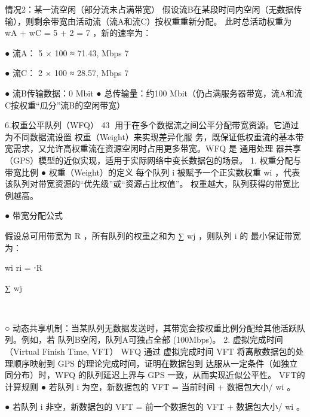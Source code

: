 情况2：某一流空闲（部分流未占满带宽）
假设流B在某段时间内空闲（无数据传输），则剩余带宽由活动流（流A和流C）按权重重新分配。
此时总活动权重为 wA + wC = 5 + 2 = 7 ，新的速率为：    ​   ​




 ● 流A：
       5
         × 100 ≈ 71.43, Mbps
       7
        ​




 ● 流C：
       2
         × 100 ≈ 28.57, Mbps
       7
            ​




 ● 流B传输数据：0 Mbit
 ● 总传输量：约100 Mbit（仍占满服务器带宽，流A和流C按权重“瓜分”流B的空闲带宽）




6.权重公平队列（WFQ）
                                                                43
用于在多个数据流之间公平分配带宽资源。它通过为不同数据流设置 权重（Weight）来实现差异化服
务，既保证低权重流的基本带宽需求，又允许高权重流在资源空闲时占用更多带宽。WFQ 是 通用处理
器共享（GPS）模型的近似实现，适用于实际网络中变长数据包的场景。
1. 权重分配与带宽比例
 ● 权重（Weight）的定义
   每个队列 i 被赋予一个正实数权重 wi ，代表该队列对带宽资源的“优先级”或“资源占比权值”。
   权重越大，队列获得的带宽比例越高。
                                             ​




 ● 带宽分配公式

   假设总可用带宽为 R ，所有队列的权重之和为 ∑ wj ，则队列 i 的 最小保证带宽 为：​




               wi
     ri =          ⋅R
                ​




              ∑ wj
         ​              ​




                    ​




     ○       动态共享机制：当某队列无数据发送时，其带宽会按权重比例分配给其他活跃队列。例如，若
             队列B空闲，队列A可独占全部 (100Mbps)。
2. 虚拟完成时间（Virtual Finish Time, VFT）
WFQ 通过 虚拟完成时间 VFT 将离散数据包的处理顺序映射到 GPS 的理论完成时间，证明在数据包到
达服从一定条件（如独立同分布）时，WFQ 的队列延迟上界与 GPS 一致，从而实现近似公平性。
VFT的计算规则
 ● 若队列 i 为空，新数据包的 VFT = 当前时间 + 数据包大小/ wi 。                           ​




 ● 若队列 i 非空，新数据包的 VFT = 前一个数据包的 VFT + 数据包大小/ wi 。                        ​




